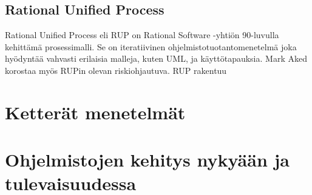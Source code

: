 \documentclass[finnish,12pt]{tktltiki2}
\theoremstyle{definition}
\theoremstyle{remark}
\begin{document}
 
\subsection{Rational Unified Process}

Rational Unified Process eli RUP on Rational Software -yhtiön 90-luvulla kehittämä prosessimalli. Se on iteratiivinen ohjelmistotuotantomenetelmä joka hyödyntää vahvasti erilaisia malleja, kuten UML, ja käyttötapauksia\cite{Ruparelia:2010:SDL:1764810.1764814}. Mark Aked korostaa myös RUPin olevan riskiohjautuva\cite{Aked03}.
RUP rakentuu  




\section{Ketterät menetelmät}
\section{Ohjelmistojen kehitys nykyään ja tulevaisuudessa}

%
%
% 
%







% 
\end{document}
